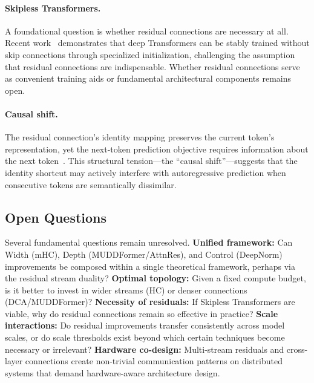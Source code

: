 \paragraph{Skipless Transformers.}
A foundational question is whether residual connections are necessary at all. Recent work~\cite{he2023deep} demonstrates that deep Transformers can be stably trained without skip connections through specialized initialization, challenging the assumption that residual connections are indispensable. Whether residual connections serve as convenient training aids or fundamental architectural components remains open.

\paragraph{Causal shift.}
The residual connection's identity mapping preserves the current token's representation, yet the next-token prediction objective requires information about the next token~\cite{causalshift2026}. This structural tension---the ``causal shift''---suggests that the identity shortcut may actively interfere with autoregressive prediction when consecutive tokens are semantically dissimilar.

\subsection{Open Questions}

Several fundamental questions remain unresolved. \textbf{Unified framework:} Can Width (mHC), Depth (MUDDFormer/AttnRes), and Control (DeepNorm) improvements be composed within a single theoretical framework, perhaps via the residual stream duality? \textbf{Optimal topology:} Given a fixed compute budget, is it better to invest in wider streams (HC) or denser connections (DCA/MUDDFormer)? \textbf{Necessity of residuals:} If Skipless Transformers are viable, why do residual connections remain so effective in practice? \textbf{Scale interactions:} Do residual improvements transfer consistently across model scales, or do scale thresholds exist beyond which certain techniques become necessary or irrelevant? \textbf{Hardware co-design:} Multi-stream residuals and cross-layer connections create non-trivial communication patterns on distributed systems that demand hardware-aware architecture design.
